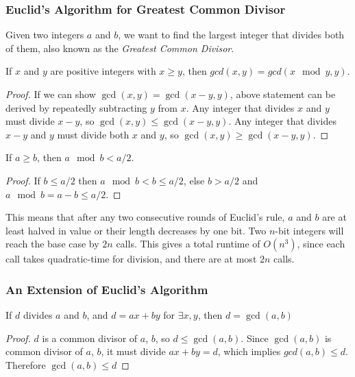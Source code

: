 \subsubsection{Euclid's Algorithm for Greatest Common Divisor}
Given two integers $a$ and $b$, we want to find the largest integer that divides both of them, also known as the \emph{Greatest Common Divisor}.
\begin{thm}
  If $x$ and $y$ are positive integers with $x \geq y$, then $gcd(x, y) = gcd(x \mod y, y)$.
\end{thm}
\begin{proof}
  If we can show $\gcd(x, y) = \gcd(x-y, y)$, above statement can be derived by repeatedly subtracting $y$ from $x$.
  Any integer that divides $x$ and $y$ must divide $x-y$, so $\gcd(x, y) \leq \gcd(x - y, y)$.
  Any integer that divides $x-y$ and $y$ must divide both $x$ and $y$, so $\gcd(x, y) \geq \gcd(x-y, y)$.
\end{proof}

\begin{lemma}
  If $a \geq b$, then $a \mod b < a / 2$.
\end{lemma}
\begin{proof}
	If $b \leq a/2$ then $a \mod b < b \leq a/2$, else $b > a/2$ and $a \mod b = a - b \leq a/2$.
\end{proof}
This means that after any two consecutive rounds of Euclid's rule, $a$ and $b$ are at least halved in value or their length decreases by one bit.
Two $n$-bit integers will reach the base case by $2n$ calls.
This gives a total runtime of $O(n^3)$, since each call takes quadratic-time for division, and there are at most $2n$ calls.

\subsubsection{An Extension of Euclid's Algorithm}
\begin{lemma}
  If $d$ divides $a$ and $b$, and $d = ax + by$ for $\exists x, y$, then $d = \gcd(a, b)$
\end{lemma}
\begin{proof}
	  $d$ is a common divisor of $a$, $b$, so $d \leq \gcd(a, b)$. Since $\gcd(a, b)$ is common divisor of $a$, $b$, it must divide $ax + by = d$, which implies $gcd(a, b) \leq d$. Therefore $\gcd(a, b) \leq d$
\end{proof}

